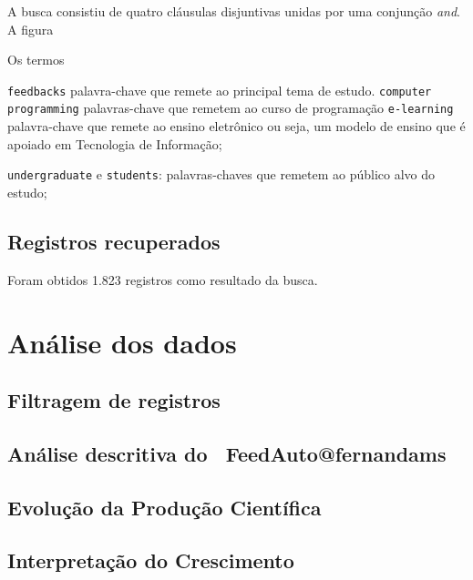 A busca consistiu de quatro cláusulas disjuntivas unidas por uma conjunção \textit{and}. A figura

Os termos

 \texttt{feedbacks} palavra-chave que remete ao principal tema de estudo.
 \texttt{computer programming} palavras-chave que remetem ao curso de programação 
 \texttt{e-learning} palavra-chave  que remete ao ensino eletrônico ou seja, um modelo de ensino que é apoiado em Tecnologia de Informação;

\texttt{undergraduate} e \texttt{students}: palavras-chaves que remetem ao público alvo do estudo; 

\subsection{Registros recuperados}

Foram obtidos 1.823 registros como resultado da busca. 

\section{Análise dos dados}

\subsection{Filtragem de registros}

\subsection{Análise descritiva do \dataset\ FeedAuto@fernandams} 

\subsection{Evolução da Produção Científica}

\subsection{Interpretação do Crescimento}

